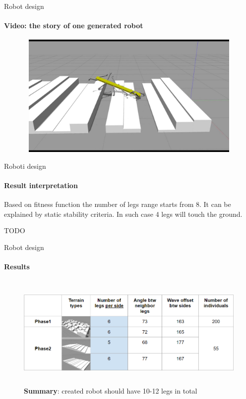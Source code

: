 \documentclass[aspectratio=169]{beamer}
\begin{document}
\begin{frame}[t]{Robot design}
    \framesubtitle{Video: the story of one generated robot}
    \vspace{-0.6cm}
    \begin{figure}[H]
        \href{https://youtu.be/DcovvkTZgsg}{
            \centering\includegraphics[height=6cm,width=1\textwidth,keepaspectratio]{genetic_video_preview.jpg}}
    \end{figure}
\end{frame}

\begin{frame}[t]{Roboti design}
    \framesubtitle{Result interpretation}
    Based on fitness function the number of legs range starts from 8. It can be explained by static stability criteria. In such case 4 legs will touch the ground.

    \alert{TODO}
\end{frame}

\begin{frame}[t]{Robot design}
    \framesubtitle{Results}
    \vspace{-0.5cm}
    \begin{figure}[H]
        \centering\includegraphics[height=5.5cm,width=1\textwidth,keepaspectratio]{table_terrain.png}
        \caption*{\LARGE\centering\textbf{Summary}: created robot should have 10-12 legs in total}
        \label{fig:table_terrain.png}
    \end{figure}
\end{frame}
\end{document}
